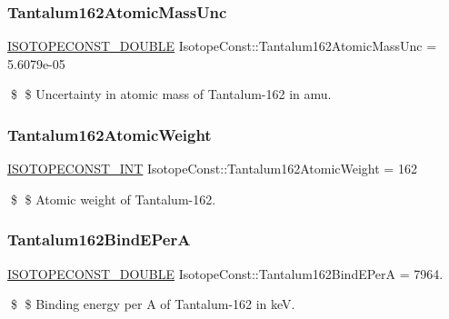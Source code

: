 \subsubsection{\texorpdfstring{Tantalum162\+Atomic\+Mass\+Unc}{Tantalum162AtomicMassUnc}}
{\footnotesize\ttfamily \mbox{\hyperlink{group___isotope_const-_macros_ga8f45a7272ce02c0b4c65c44636ed719a}{I\+S\+O\+T\+O\+P\+E\+C\+O\+N\+S\+T\+\_\+\+D\+O\+U\+B\+LE}} Isotope\+Const\+::\+Tantalum162\+Atomic\+Mass\+Unc = 5.\+6079e-\/05}

\$ \$ Uncertainty in atomic mass of Tantalum-\/162 in amu. \mbox{\label{group___isotope_const-_tantalum-_ta162_ga26effcbfabfafa111435d52076fa6c27}} 
\subsubsection{\texorpdfstring{Tantalum162\+Atomic\+Weight}{Tantalum162AtomicWeight}}
{\footnotesize\ttfamily \mbox{\hyperlink{group___isotope_const-_macros_ga5f18360b3e99483a35c32d789e62621c}{I\+S\+O\+T\+O\+P\+E\+C\+O\+N\+S\+T\+\_\+\+I\+NT}} Isotope\+Const\+::\+Tantalum162\+Atomic\+Weight = 162}

\$ \$ Atomic weight of Tantalum-\/162. \mbox{\label{group___isotope_const-_tantalum-_ta162_gae72b1b60e0fa90ebc773a1a2c8a16316}} 
\subsubsection{\texorpdfstring{Tantalum162\+Bind\+E\+PerA}{Tantalum162BindEPerA}}
{\footnotesize\ttfamily \mbox{\hyperlink{group___isotope_const-_macros_ga8f45a7272ce02c0b4c65c44636ed719a}{I\+S\+O\+T\+O\+P\+E\+C\+O\+N\+S\+T\+\_\+\+D\+O\+U\+B\+LE}} Isotope\+Const\+::\+Tantalum162\+Bind\+E\+PerA = 7964.}

\$ \$ Binding energy per A of Tantalum-\/162 in keV. \mbox{\label{group___isotope_const-_tantalum-_ta162_gaccd27d22473bc2962a811f7b1cbb839c}} 
